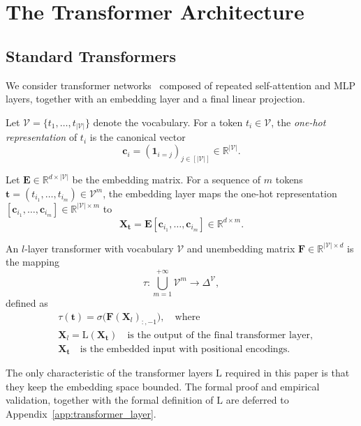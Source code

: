 \section{The Transformer Architecture}

\subsection{Standard Transformers}

We consider transformer networks~\citep{Vaswani_A_2017_p-nips-OG} composed of repeated self-attention and MLP layers, together with an embedding layer and a final linear projection.

\begin{definition}
Let $\mathcal V=\{t_1,\ldots,t_{|\mathcal V|}\}$ denote the vocabulary.  
For a token $t_i\in\mathcal V$, the \emph{one-hot representation} of $t_i$ is the canonical vector 
\[
\mathbf c_i=(\mathbf1_{i=j})_{j\in[|\mathcal V|]}\in\mathbb R^{|\mathcal V|}.
\]
\end{definition}


\begin{definition}
Let $\mathbf{E}\in\mathbb R^{d\times |\mathcal{V}|}$ be the embedding matrix.  
For a sequence of $m$ tokens $\mathbf{t}=(t_{i_1},\ldots,t_{i_m})\in\mathcal{V}^m$, the embedding layer maps the one-hot representation $[\mathbf c_{i_1},\ldots,\mathbf c_{i_m}]\in\mathbb R^{|\mathcal V|\times m}$ to
\[
\mathbf{X}_{\mathbf t} = \mathbf{E}[\mathbf c_{i_1},\ldots,\mathbf c_{i_m}]\in\mathbb R^{d\times m}.
\]
\end{definition}

\begin{definition}\label{def:hard_prompt}
    An $l$-layer transformer with vocabulary $\mathcal V$ and unembedding matrix $\mathbf F\in\mathbb R^{|\mathcal{V}|\times d}$ is the mapping
    \[
    \tau:\bigcup_{m=1}^{+\infty}\mathcal{V}^m \longrightarrow \Delta^{\mathcal{V}},
    \]
    defined as
    \begin{align*}
        &\tau(\mathbf{t}) = \sigma\big( \mathbf F (\mathbf{X}_l)_{:,-1} \big),\quad\mbox{where}\\
    &\mathbf{X}_l = \mathrm L(\mathbf{X}_{\mathbf t})\quad\mbox{is the output of the final transformer layer,}\\
    &\mathbf{X}_{\mathbf t}\quad\mbox{is the embedded input with positional encodings.}
    \end{align*}

    The only characteristic of the transformer layers $\mathrm L$ required in this paper is that they keep the embedding space bounded. The formal proof and empirical validation, together with the formal definition of $\mathrm L$ are deferred to Appendix~\ref{app:transformer_layer}.
\end{definition}

